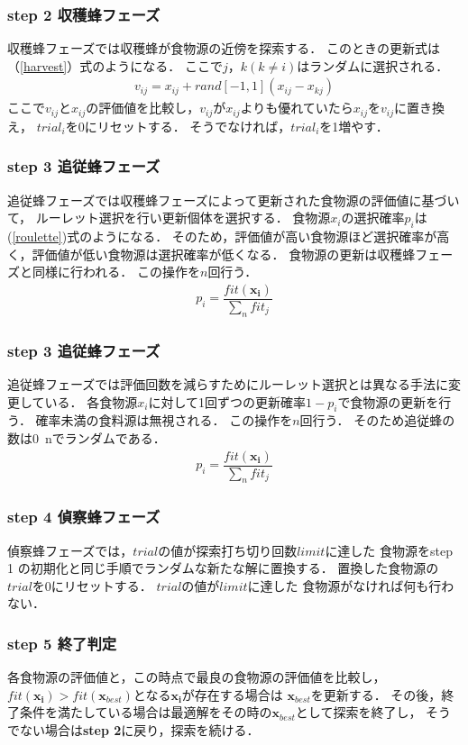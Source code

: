 \subsubsection*{step 2 収穫蜂フェーズ}
収穫蜂フェーズでは収穫蜂が食物源の近傍を探索する．
このときの更新式は（\ref{harvest}）式のようになる．
ここで$j，k(k\neq i)$はランダムに選択される．
\begin{align}
v_{ij} = x_{ij} + rand[-1,1](x_{ij}-x_{kj})\label{harvest}
\end{align}
ここで$v_{ij}$と$x_{ij}$の評価値を比較し，$v_{ij}$が$x_{ij}$よりも優れていたら$x_{ij}$を$v_{ij}$に置き換え，
$trial_i$を0にリセットする．
そうでなければ，$trial_i$を1増やす．
\subsubsection*{step 3 追従蜂フェーズ}
追従蜂フェーズでは収穫蜂フェーズによって更新された食物源の評価値に基づいて，
ルーレット選択を行い更新個体を選択する．
食物源$x_i$の選択確率$p_i$は(\ref{roulette})式のようになる．
そのため，評価値が高い食物源ほど選択確率が高く，評価値が低い食物源は選択確率が低くなる．
食物源の更新は収穫蜂フェーズと同様に行われる．
この操作を$n$回行う．
\begin{align}
    p_i = \dfrac{fit(\boldsymbol{x_{i}})}{\sum_{n}fit_j}\label{roulette}
\end{align}
\subsubsection*{step 3 追従蜂フェーズ}
追従蜂フェーズでは評価回数を減らすためにルーレット選択とは異なる手法に変更している．
各食物源$x_i$に対して1回ずつの更新確率$1 - p_i$で食物源の更新を行う．
確率未満の食料源は無視される．
この操作を$n$回行う．
そのため追従蜂の数は0~nでランダムである．
\begin{align}
    p_i = \dfrac{fit(\boldsymbol{x_{i}})}{\sum_{n}fit_j}\label{roulette}
\end{align}
\subsubsection*{step 4 偵察蜂フェーズ}
偵察蜂フェーズでは，$trial$の値が探索打ち切り回数$limit$に達した
食物源をstep 1 の初期化と同じ手順でランダムな新たな解に置換する． 
置換した食物源の$trial$を0にリセットする．
$trial$の値が$limit$に達した
食物源がなければ何も行わない．
\subsubsection*{step 5 終了判定}
各食物源の評価値と，この時点で最良の食物源の評価値を比較し，
$fit(\boldsymbol{x_{i}}) > fit(\boldsymbol{x}_{best})$となる$\boldsymbol{x_{i}}$が存在する場合は
$\boldsymbol{x}_{best}$を更新する．
その後，終了条件を満たしている場合は最適解をその時の$\boldsymbol{x}_{best}$として探索を終了し，
そうでない場合は\textbf{step 2}に戻り，探索を続ける．